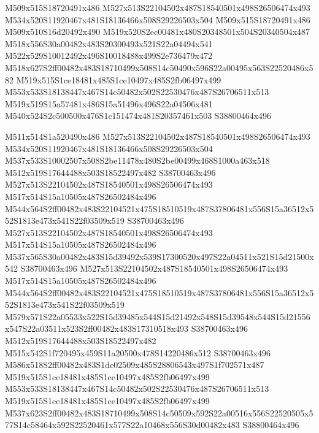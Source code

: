 \documentclass{article}
\begin{document}
\begin{multicols}{2}
M509x515S18720491x486 M527x513S22104502x487S18540501x498S26506474x493 M534x520S11920467x481S18136466x508S29226503x504 M509x515S18720491x486 M509x510S16d20492x490 M519x520S2ec00481x480S20348501x504S20340504x487 M518x556S30a00482x483S20300493x521S22a04494x541 M522x529S10012492x496S10018488x499S2e736479x472 M518x627S2ff00482x483S18710499x508S14c50490x596S22a00495x563S22520486x582 M519x515S1ce18481x485S1ce10497x485S2fb06497x499 M553x533S18138447x467S14c50482x502S22530476x487S26706511x513 M519x519S15a57481x486S15a51496x496S22a04506x481 M540x524S2c500500x476S1c151474x481S20357461x503 S38800464x496

M511x514S1a520490x486 M527x513S22104502x487S18540501x498S26506474x493 M534x520S11920467x481S18136466x508S29226503x504 M537x533S10002507x508S2be11478x480S2be00499x468S1000a463x518 M512x519S17644488x503S18522497x482 S38700463x496 M527x513S22104502x487S18540501x498S26506474x493 M517x514S15a10505x487S26502484x496 M544x564S2ff00482x483S22104521x475S18510519x487S37806481x556S15a36512x552S1813e473x541S22f03509x519 S38700463x496 M527x513S22104502x487S18540501x498S26506474x493 M517x514S15a10505x487S26502484x496 M537x565S30a00482x483S15d39492x539S17300520x497S22a04511x521S15d21500x542 S38700463x496 M527x513S22104502x487S18540501x498S26506474x493 M517x514S15a10505x487S26502484x496 M544x564S2ff00482x483S22104521x475S18510519x487S37806481x556S15a36512x552S1813e473x541S22f03509x519 M579x571S22a05533x522S15d39485x544S15d21492x548S15d39548x544S15d21556x547S22a03511x523S2ff00482x483S17310518x493 S38700463x496 M512x519S17644488x503S18522497x482 M515x542S1f720495x459S11a20500x478S14220486x512 S38700463x496 M586x518S2ff00482x483S1de02509x485S28806543x497S1f702571x487 M519x515S1ce18481x485S1ce10497x485S2fb06497x499 M553x533S18138447x467S14c50482x502S22530476x487S26706511x513 M519x515S1ce18481x485S1ce10497x485S2fb06497x499 M537x623S2ff00482x483S18710499x508S14c50509x592S22a00516x556S22520505x577S14c58464x592S22520461x577S22a10468x556S30d00482x483 S38800464x496


\end{multicols}
\end{document}
